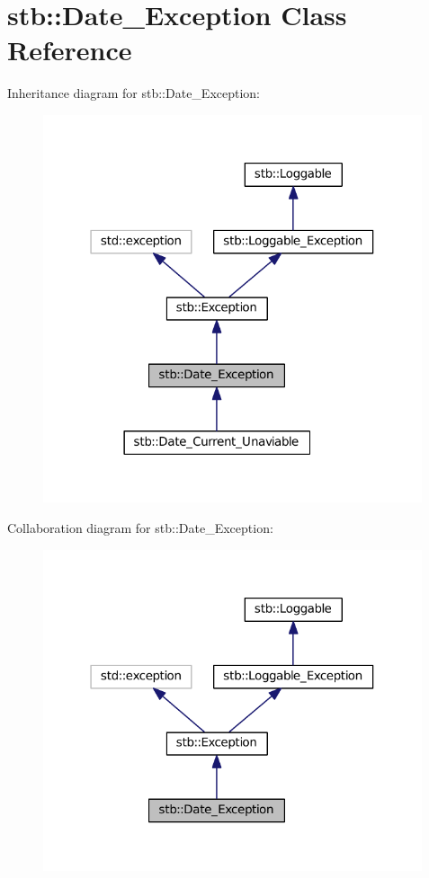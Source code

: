 \hypertarget{classstb_1_1Date__Exception}{\section{stb\+:\+:Date\+\_\+\+Exception Class Reference}
\label{classstb_1_1Date__Exception}
}


Inheritance diagram for stb\+:\+:Date\+\_\+\+Exception\+:
\nopagebreak
\begin{figure}[H]
\begin{center}
\leavevmode
\includegraphics[width=316pt]{classstb_1_1Date__Exception__inherit__graph}
\end{center}
\end{figure}


Collaboration diagram for stb\+:\+:Date\+\_\+\+Exception\+:
\nopagebreak
\begin{figure}[H]
\begin{center}
\leavevmode
\includegraphics[width=316pt]{classstb_1_1Date__Exception__coll__graph}
\end{center}
\end{figure}
